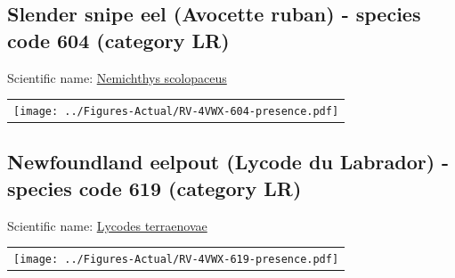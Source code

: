 \documentclass[12pt]{article}\usepackage[]{graphicx}\usepackage[]{color}
\begin{document}
\renewcommand\thefigure{\thesubsection\Alph{figure}}

\setcounter{figure}{0}

\hypertarget{sec:604}{%
\subsection{Slender snipe eel (Avocette ruban) - species code 604 (category LR)}\label{sec:604}}

  


Scientific name: \href{http://www.marinespecies.org/aphia.php?p=taxdetails\&id=126306}{Nemichthys scolopaceus} \newline
\begin{minipage}{1.0\textwidth}
 \begin{tabular}{c}
\texttt{[image: ../Figures-Actual/RV-4VWX-604-presence.pdf]} \\ 
\end{tabular} 
\end{minipage}
\clearpage

\renewcommand\thefigure{\thesubsection\Alph{figure}}

\setcounter{figure}{0}

\hypertarget{sec:619}{%
\subsection{Newfoundland eelpout (Lycode du Labrador) - species code 619 (category LR)}\label{sec:619}}

  


Scientific name: \href{http://www.marinespecies.org/aphia.php?p=taxdetails\&id=127117}{Lycodes terraenovae} \newline
\begin{minipage}{1.0\textwidth}
 \begin{tabular}{c}
\texttt{[image: ../Figures-Actual/RV-4VWX-619-presence.pdf]} \\ 
\end{tabular} 
\end{minipage}
\clearpage
\end{document}
